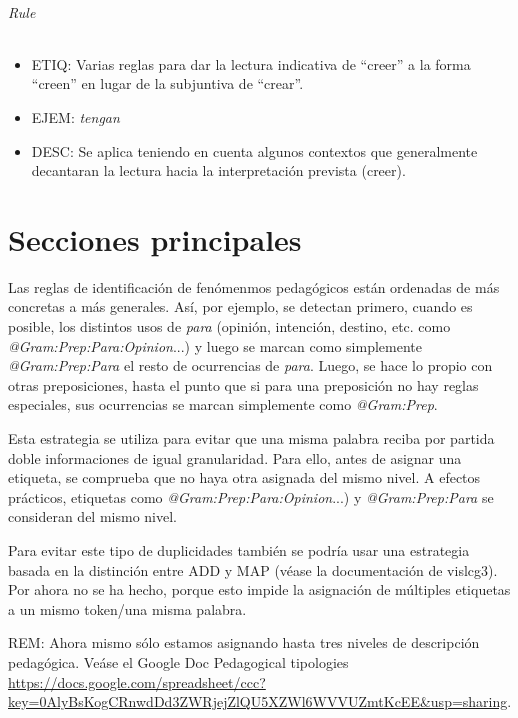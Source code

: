 \documentclass[11pt]{report}
\begin{document}
\paragraph*{Rule}
\begin{itemize}
\item ETIQ: Varias reglas para dar la lectura indicativa de ``creer'' a la forma ``creen'' en lugar de la subjuntiva de ``crear''. 
\item EJEM: \emph{tengan} 
\item DESC: Se aplica teniendo en cuenta algunos contextos que generalmente decantaran la lectura hacia la interpretación prevista (creer).
\end{itemize}

\part{Secciones principales}
Las reglas de identificación de fenómenmos pedagógicos están ordenadas de más concretas a más generales. Así, por ejemplo, se detectan primero, cuando es posible, los distintos usos de \emph{para} (opinión, intención, destino, etc. como \emph{@Gram:Prep:Para:Opinion}...) y luego se marcan como simplemente \emph{@Gram:Prep:Para} el resto de ocurrencias de \emph{para}. Luego, se hace lo propio con otras preposiciones, hasta el punto que si para una preposición no hay reglas especiales, sus ocurrencias se marcan simplemente como \emph{@Gram:Prep}.

Esta estrategia se utiliza para evitar que una misma palabra reciba por partida doble informaciones de igual granularidad. Para ello, antes de asignar una etiqueta, se comprueba que no haya otra asignada del mismo nivel. A efectos prácticos, etiquetas como \emph{@Gram:Prep:Para:Opinion}...) y \emph{@Gram:Prep:Para} se consideran del mismo nivel.

Para evitar este tipo de duplicidades también se podría usar una estrategia basada en la distinción entre ADD y MAP (véase la documentación de vislcg3). Por ahora no se ha hecho, porque esto impide la asignación de múltiples etiquetas a un mismo token/una misma palabra.

REM: Ahora mismo sólo estamos asignando hasta tres niveles de descripción pedagógica. Veáse el Google Doc Pedagogical tipologies \url{https://docs.google.com/spreadsheet/ccc?key=0AlyBsKogCRnwdDd3ZWRjejZlQU5XZWl6WVVUZmtKcEE&usp=sharing}.
\end{document}
